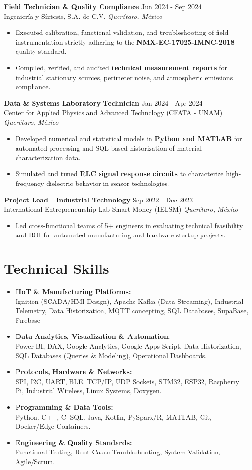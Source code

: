 \documentclass[10pt,a4paper]{article}
\newcommand{\workexp}[5]{
    \textbf{#1} \hfill #2\\
    \textcolor{primary}{#3} \hfill \textit{#4}\vspace{5pt}
    \begin{itemize}[leftmargin=*,nosep]
    #5
    \end{itemize}
    \vspace{5pt}
}
\begin{document}
\workexp{Field Technician \& Quality Compliance}{Jun 2024 - Sep 2024}{Ingeniería y Síntesis, S.A. de C.V.}{Querétaro, México}{
    \item Executed calibration, functional validation, and troubleshooting of field instrumentation strictly adhering to the \textbf{NMX-EC-17025-IMNC-2018} quality standard.
    \item Compiled, verified, and audited \textbf{technical measurement reports} for industrial stationary sources, perimeter noise, and atmospheric emissions compliance.
}
\vspace{4pt}

\workexp{Data \& Systems Laboratory Technician}{Jan 2024 - Apr 2024}{Center for Applied Physics and Advanced Technology (CFATA - UNAM)}{Querétaro, México}{
    \item Developed numerical and statistical models in \textbf{Python and MATLAB} for automated processing and SQL-based historization of material characterization data.
    \item Simulated and tuned \textbf{RLC signal response circuits} to characterize high-frequency dielectric behavior in sensor technologies.
}
\vspace{4pt}

\workexp{Project Lead - Industrial Technology}{Sep 2022 - Dec 2023}{International Entrepreneurship Lab Smart Money (IELSM)}{Querétaro, México}{
    \item Led cross-functional teams of 5+ engineers in evaluating technical feasibility and ROI for automated manufacturing and hardware startup projects.
}

\section*{Technical Skills}
\begin{itemize}[leftmargin=*]
    \item \textbf{IIoT \& Manufacturing Platforms:}\\
    Ignition (SCADA/HMI Design), Apache Kafka (Data Streaming), Industrial Telemetry, Data Historization, MQTT concepting, SQL Databases, SupaBase, Firebase
    \item \textbf{Data Analytics, Visualization \& Automation:}\\
    Power BI, DAX, Google Analytics, Google Apps Script, Data Historization, SQL Databases (Queries \& Modeling), Operational Dashboards.
    \item \textbf{Protocols, Hardware \& Networks:}\\
    SPI, I2C, UART, BLE, TCP/IP, UDP Sockets, STM32, ESP32, Raspberry Pi, Industrial Wireless, Linux Systems, Doxygen.
    \item \textbf{Programming \& Data Tools:}\\
    Python, C++, C, SQL, Java, Kotlin, PySpark/R, MATLAB, Git, Docker/Edge Containers.
    \item \textbf{Engineering \& Quality Standards:}\\
    Functional Testing, Root Cause Troubleshooting, System Validation, Agile/Scrum.
\end{itemize}
\end{document}
